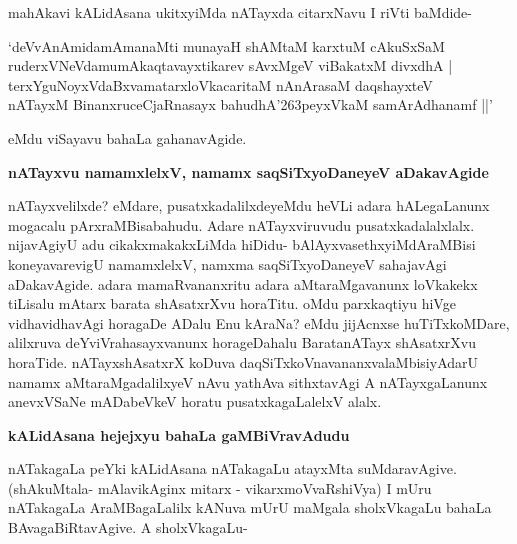 \noindent
mahAkavi kALidAsana ukitxyiMda nATayxda citarxNavu I riVti baMdide-

\begin{shloka}
`deVvAnAmidamAmanaMti munayaH shAMtaM karxtuM cAkuSxSaM\\\label{242}
ruderxVNeVdamumAkaqtavayxtikarev sAvxMgeV viBakatxM divxdhA |\\
terxYguNoyxVdaBxvamatarxloVkacaritaM nAnArasaM daqshayxteV\\
nATayxM BinanxruceCjaRnasayx bahudhA\char'263peyxVkaM samArAdhanamf ||'
\end{shloka}

\noindent
eMdu viSayavu bahaLa gahanavAgide.

\vfill\eject

{\noindent
{\large\bf nATayxvu namamxlelxV, namamx saqSiTxyoDaneyeV aDakavAgide}}\label{page242}
\medskip

\noindent
nATayxvelilxde? eMdare, pusatxkadalilxdeyeMdu heVLi adara hALegaLanunx mogacalu pArxraMBisabahudu. Adare nATayxviruvudu pusatxkadalalxlalx. nijavAgiyU adu cikakxmakakxLiMda hiDidu- bAlAyxvasethxyiMdA\-raMBisi koneyavarevigU namamxlelxV, namxma saqSiTxyoDaneyeV sahajavAgi aDakavAgide. adara mamaR\-vananxritu adara aMtaraMgavanunx loVkakekx tiLisalu mAtarx barata shAsatxrXvu horaTitu. oMdu parxkaq\-tiyu hiVge vidhavidhavAgi horagaDe ADalu Enu kAraNa? eMdu jijAcnxse huTiTxkoMDare, alilxruva deYviV\-rahasayx\-vanunx horageDahalu BaratanATayx shAsatxrXvu horaTide. nATayxshAsatxrX koDuva daqSiTxkoVnavananxva\-laMbisi\-yAdarU namamx aMtaraMgadalilxyeV nAvu yathAva sithxtavAgi A nATayxgaLanunx anevxVSaNe mADa\-beVkeV horatu pusatxkagaLalelxV alalx.

{\bigskip
\noindent
{\large\bf kALidAsana hejejxyu bahaLa gaMBiVravAdudu}}\label{page243}
\medskip

\noindent
nATakagaLa peYki kALidAsana nATakagaLu atayxMta suMdaravAgive. (shAkuMtala- mAlavikAginx mitarx - vikarxmoVvaRshiVya) I mUru nATakagaLa AraMBagaLalilx kANuva mUrU maMgala sholxVkagaLu bahaLa BAvagaBiRtavAgive. A sholxVkagaLu-


